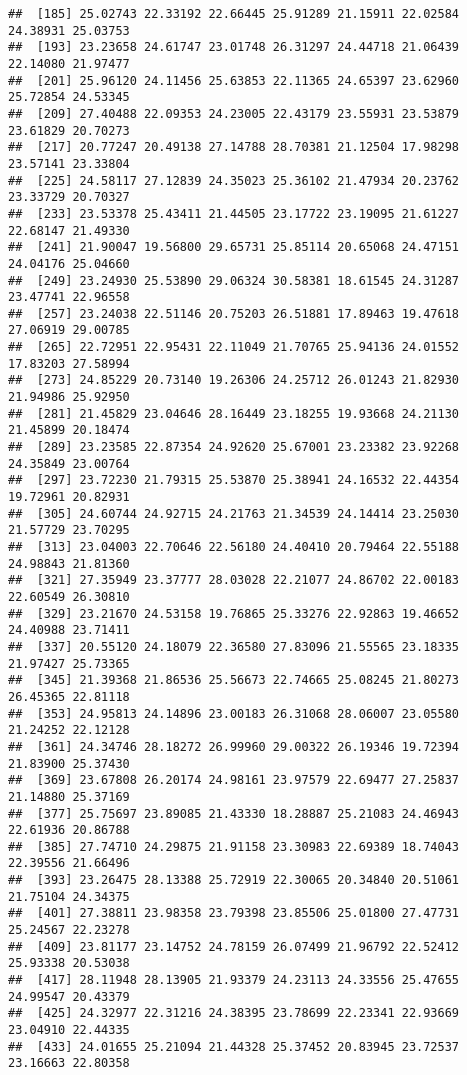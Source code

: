 \documentclass[
]{article}
\begin{document}
\begin{verbatim}
##  [185] 25.02743 22.33192 22.66445 25.91289 21.15911 22.02584 24.38931 25.03753
##  [193] 23.23658 24.61747 23.01748 26.31297 24.44718 21.06439 22.14080 21.97477
##  [201] 25.96120 24.11456 25.63853 22.11365 24.65397 23.62960 25.72854 24.53345
##  [209] 27.40488 22.09353 24.23005 22.43179 23.55931 23.53879 23.61829 20.70273
##  [217] 20.77247 20.49138 27.14788 28.70381 21.12504 17.98298 23.57141 23.33804
##  [225] 24.58117 27.12839 24.35023 25.36102 21.47934 20.23762 23.33729 20.70327
##  [233] 23.53378 25.43411 21.44505 23.17722 23.19095 21.61227 22.68147 21.49330
##  [241] 21.90047 19.56800 29.65731 25.85114 20.65068 24.47151 24.04176 25.04660
##  [249] 23.24930 25.53890 29.06324 30.58381 18.61545 24.31287 23.47741 22.96558
##  [257] 23.24038 22.51146 20.75203 26.51881 17.89463 19.47618 27.06919 29.00785
##  [265] 22.72951 22.95431 22.11049 21.70765 25.94136 24.01552 17.83203 27.58994
##  [273] 24.85229 20.73140 19.26306 24.25712 26.01243 21.82930 21.94986 25.92950
##  [281] 21.45829 23.04646 28.16449 23.18255 19.93668 24.21130 21.45899 20.18474
##  [289] 23.23585 22.87354 24.92620 25.67001 23.23382 23.92268 24.35849 23.00764
##  [297] 23.72230 21.79315 25.53870 25.38941 24.16532 22.44354 19.72961 20.82931
##  [305] 24.60744 24.92715 24.21763 21.34539 24.14414 23.25030 21.57729 23.70295
##  [313] 23.04003 22.70646 22.56180 24.40410 20.79464 22.55188 24.98843 21.81360
##  [321] 27.35949 23.37777 28.03028 22.21077 24.86702 22.00183 22.60549 26.30810
##  [329] 23.21670 24.53158 19.76865 25.33276 22.92863 19.46652 24.40988 23.71411
##  [337] 20.55120 24.18079 22.36580 27.83096 21.55565 23.18335 21.97427 25.73365
##  [345] 21.39368 21.86536 25.56673 22.74665 25.08245 21.80273 26.45365 22.81118
##  [353] 24.95813 24.14896 23.00183 26.31068 28.06007 23.05580 21.24252 22.12128
##  [361] 24.34746 28.18272 26.99960 29.00322 26.19346 19.72394 21.83900 25.37430
##  [369] 23.67808 26.20174 24.98161 23.97579 22.69477 27.25837 21.14880 25.37169
##  [377] 25.75697 23.89085 21.43330 18.28887 25.21083 24.46943 22.61936 20.86788
##  [385] 27.74710 24.29875 21.91158 23.30983 22.69389 18.74043 22.39556 21.66496
##  [393] 23.26475 28.13388 25.72919 22.30065 20.34840 20.51061 21.75104 24.34375
##  [401] 27.38811 23.98358 23.79398 23.85506 25.01800 27.47731 25.24567 22.23278
##  [409] 23.81177 23.14752 24.78159 26.07499 21.96792 22.52412 25.93338 20.53038
##  [417] 28.11948 28.13905 21.93379 24.23113 24.33556 25.47655 24.99547 20.43379
##  [425] 24.32977 22.31216 24.38395 23.78699 22.23341 22.93669 23.04910 22.44335
##  [433] 24.01655 25.21094 21.44328 25.37452 20.83945 23.72537 23.16663 22.80358

\end{verbatim}
\end{document}
